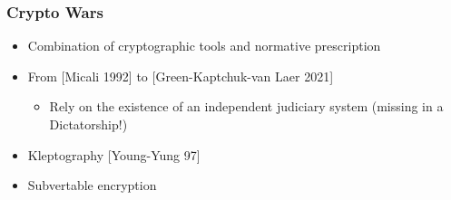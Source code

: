 \documentclass[handout]{beamer}
\begin{document}
\begin{frame}
\frametitle{Crypto Wars}

\begin{itemize}
\item Combination of cryptographic tools and normative prescription

\item From [Micali 1992] to [Green-Kaptchuk-van Laer 2021]

\begin{itemize}
\item Rely on the existence of an independent judiciary system (missing in a Dictatorship!)
\end{itemize}
\item Kleptography [Young-Yung 97]
\item Subvertable encryption
\end{itemize}
\end{frame}
\end{document}
